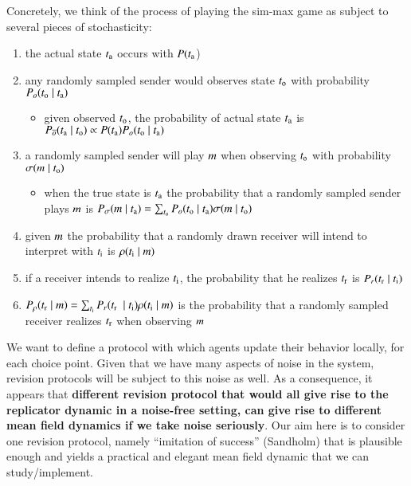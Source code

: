 \documentclass[fleqn,reqno,11pt]{article}
\begin{document}
Concretely, we think of the process of playing the sim-max game as subject to several pieces of
stochasticity:
\begin{enumerate}
\item the actual state $t_{\mathrm{a}}$ occurs with $P(t_{\mathrm{a}}$)
\item any randomly sampled sender would observes state $t_{\mathrm{o}}$ with probability
  $P_o(t_{\mathrm{o}} \mid t_{\mathrm{a}})$
  \begin{itemize}
  \item given observed $t_{\mathrm{o}}$, the probability of actual state $t_{\mathrm{a}}$ is
    $P_{\overline{o}}(t_{\mathrm{a}} \mid t_{\mathrm{o}}) \propto P(t_{\mathrm{a}}) P_o(t_{\mathrm{o}}
    \mid t_{\mathrm{a}})$
  \end{itemize}
\item a randomly sampled sender will play $m$ when observing $t_{\mathrm{o}}$ with
  probability $\sigma(m \mid t_{\mathrm{o}})$
  \begin{itemize}
  \item when the true state is $t_{\mathrm{a}}$ the probability that a randomly sampled sender
    plays $m$ is $P_{\sigma}(m \mid t_{\mathrm{a}}) = \sum_{t_{\mathrm{o}}}
    P_o(t_{\mathrm{o}} \mid t_{\mathrm{a}}) \sigma(m \mid t_{\mathrm{o}})$
  \end{itemize}
\item given $m$ the probability that a randomly drawn receiver will intend to interpret
  with $t_{\mathrm{i}}$ is $\rho(t_{\mathrm{i}} \mid m)$
\item if a receiver intends to realize $t_{\mathrm{i}}$, the probability that he realizes
  $t_{\mathrm{r}}$ is $P_r(t_{\mathrm{r}} \mid t_{\mathrm{i}})$
\item $P_{\rho}(t_{\mathrm{r}} \mid m) = \sum_{t_{\mathrm{i}}} P_r(t_{\mathrm{r}} \ \mid
  t_{\mathrm{i}}) \rho(t_{\mathrm{i}} \mid m)$ is the probability that a randomly sampled
  receiver realizes $t_{\mathrm{r}}$ when observing $m$
\end{enumerate}

We want to define a protocol with which agents update their behavior locally, for each choice
point. Given that we have many aspects of noise in the system, revision protocols will be
subject to this noise as well. As a consequence, it appears that \textbf{different revision
  protocol that would all give rise to the replicator dynamic in a noise-free setting, can give
  rise to different mean field dynamics if we take noise seriously}. Our aim here is to
consider one revision protocol, namely ``imitation of success'' (Sandholm) that is plausible
enough and yields a practical and elegant mean field dynamic that we can study/implement.
\end{document}
